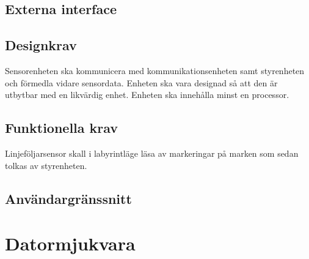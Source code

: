 \documentclass[a4paper,12pt]{article}
\begin{document}
\subsection{Externa interface}
\begin{LIPSkravlista}
\end{LIPSkravlista}

\subsection{Designkrav}
Sensorenheten ska kommunicera med kommunikationsenheten samt 
styrenheten och förmedla vidare sensordata.
Enheten ska vara designad så att den är utbytbar med en likvärdig enhet. Enheten ska innehålla minst en processor.


\begin{LIPSkravlista}
\end{LIPSkravlista}

\subsection{Funktionella krav}
Linjeföljarsensor skall i labyrintläge läsa av markeringar på marken som sedan tolkas av styrenheten.


\begin{LIPSkravlista}
\end{LIPSkravlista} 

\subsection{Användargränssnitt}
\begin{LIPSkravlista}
\end{LIPSkravlista}


\section{Datormjukvara}
\end{document}
